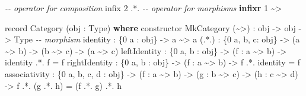 \documentclass[
]{article}
\newenvironment{Shaded}{}{}
\newcommand{\CommentTok}[1]{\textcolor[rgb]{0.38,0.63,0.69}{\textit{#1}}}
\newcommand{\DataTypeTok}[1]{\textcolor[rgb]{0.56,0.13,0.00}{#1}}
\newcommand{\DecValTok}[1]{\textcolor[rgb]{0.25,0.63,0.44}{#1}}
\newcommand{\KeywordTok}[1]{\textcolor[rgb]{0.00,0.44,0.13}{\textbf{#1}}}
\newcommand{\NormalTok}[1]{#1}
\newcommand{\OperatorTok}[1]{\textcolor[rgb]{0.40,0.40,0.40}{#1}}
\newcommand{\OtherTok}[1]{\textcolor[rgb]{0.00,0.44,0.13}{#1}}
\begin{document}
\begin{Shaded}
\begin{Highlighting}[]
\CommentTok{{-}{-} operator for composition}
\NormalTok{infix }\DecValTok{2} \OperatorTok{.*.}
\CommentTok{{-}{-} operator for morphisms}
\KeywordTok{infixr} \DecValTok{1} \OperatorTok{\textasciitilde{}\textgreater{}}

\NormalTok{record }\DataTypeTok{Category}\NormalTok{ (obj }\OperatorTok{:} \DataTypeTok{Type}\NormalTok{)  }\KeywordTok{where}
\NormalTok{  constructor }\DataTypeTok{MkCategory}
\NormalTok{  (}\OperatorTok{\textasciitilde{}\textgreater{}}\NormalTok{)          }\OperatorTok{:}\NormalTok{ obj }\OtherTok{{-}\textgreater{}}\NormalTok{ obj }\OtherTok{{-}\textgreater{}} \DataTypeTok{Type} \CommentTok{{-}{-} morphism}
\NormalTok{  identity      }\OperatorTok{:}\NormalTok{ \{}\DecValTok{0}\NormalTok{ a }\OperatorTok{:}\NormalTok{ obj\} }\OtherTok{{-}\textgreater{}}\NormalTok{ a }\OperatorTok{\textasciitilde{}\textgreater{}}\NormalTok{ a}
\NormalTok{  (}\OperatorTok{.*.}\NormalTok{)         }\OperatorTok{:}\NormalTok{ \{}\DecValTok{0}\NormalTok{ a, b, c}\OperatorTok{:}\NormalTok{ obj\}}
               \OtherTok{{-}\textgreater{}}\NormalTok{ (a }\OperatorTok{\textasciitilde{}\textgreater{}}\NormalTok{ b)}
               \OtherTok{{-}\textgreater{}}\NormalTok{ (b }\OperatorTok{\textasciitilde{}\textgreater{}}\NormalTok{ c)}
               \OtherTok{{-}\textgreater{}}\NormalTok{ (a }\OperatorTok{\textasciitilde{}\textgreater{}}\NormalTok{ c)}
\NormalTok{  leftIdentity  }\OperatorTok{:}\NormalTok{ \{}\DecValTok{0}\NormalTok{ a, b }\OperatorTok{:}\NormalTok{ obj\}}
               \OtherTok{{-}\textgreater{}}\NormalTok{ (f }\OperatorTok{:}\NormalTok{ a }\OperatorTok{\textasciitilde{}\textgreater{}}\NormalTok{ b)}
               \OtherTok{{-}\textgreater{}}\NormalTok{ identity }\OperatorTok{.*.}\NormalTok{ f }\OtherTok{=}\NormalTok{ f}
\NormalTok{  rightIdentity }\OperatorTok{:}\NormalTok{ \{}\DecValTok{0}\NormalTok{ a, b }\OperatorTok{:}\NormalTok{ obj\}}
               \OtherTok{{-}\textgreater{}}\NormalTok{ (f }\OperatorTok{:}\NormalTok{ a }\OperatorTok{\textasciitilde{}\textgreater{}}\NormalTok{ b)}
               \OtherTok{{-}\textgreater{}}\NormalTok{ f }\OperatorTok{.*.}\NormalTok{ identity }\OtherTok{=}\NormalTok{ f}
\NormalTok{  associativity }\OperatorTok{:}\NormalTok{ \{}\DecValTok{0}\NormalTok{ a, b, c, d }\OperatorTok{:}\NormalTok{ obj\}}
               \OtherTok{{-}\textgreater{}}\NormalTok{ (f }\OperatorTok{:}\NormalTok{ a }\OperatorTok{\textasciitilde{}\textgreater{}}\NormalTok{ b)}
               \OtherTok{{-}\textgreater{}}\NormalTok{ (g }\OperatorTok{:}\NormalTok{ b }\OperatorTok{\textasciitilde{}\textgreater{}}\NormalTok{ c)}
               \OtherTok{{-}\textgreater{}}\NormalTok{ (h }\OperatorTok{:}\NormalTok{ c }\OperatorTok{\textasciitilde{}\textgreater{}}\NormalTok{ d)}
               \OtherTok{{-}\textgreater{}}\NormalTok{ f }\OperatorTok{.*.}\NormalTok{ (g }\OperatorTok{.*.}\NormalTok{ h) }\OtherTok{=}\NormalTok{ (f }\OperatorTok{.*.}\NormalTok{ g) }\OperatorTok{.*.}\NormalTok{ h}
\end{Highlighting}
\end{Shaded}
\end{document}

